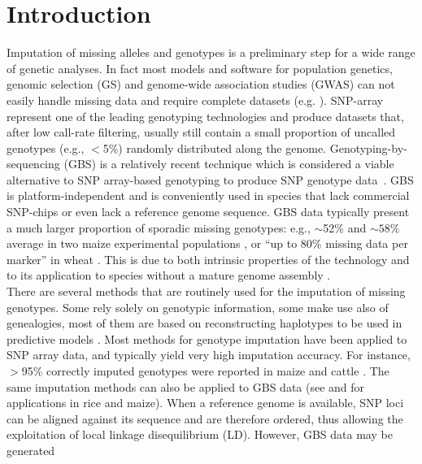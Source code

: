 \section{Introduction}
\label{intro}

Imputation of missing alleles and genotypes is a preliminary step for
a wide range of genetic analyses. In fact most models and software for 
population genetics, genomic selection (GS) and genome-wide association 
studies (GWAS) can not easily handle missing data and require complete datasets (e.g. \cite{hayes2009invited,aulchenko2007genabel,endelman2011rrblup,perez2014genome}). 
SNP-array represent one of the leading genotyping technologies and produce 
datasets that, after low call-rate filtering, 
usually still contain a small proportion of uncalled genotypes (e.g., $<$5\%) 
randomly distributed along the genome. Genotyping-by-sequencing (GBS) is a 
relatively recent technique which is considered a viable alternative to SNP array-based genotyping to produce SNP genotype data~\cite{elshire_robust_2011}.
GBS is platform-independent and is conveniently 
used in species that lack commercial SNP-chips or even lack a reference 
genome sequence. GBS data typically present a much larger proportion of 
sporadic missing genotypes: e.g., $\sim$52\% and $\sim 58\%$ average in two maize experimental populations \cite{crossa_genomic_2013},
or ``up to 80\% missing data per marker'' in wheat \cite{poland_genomic_2012}. This 
is due to both intrinsic properties of the technology
and to its application to species without a mature genome assembly \cite{glaubitz_tassel-gbs:_2014}.\\
There are several methods that are routinely used for the imputation of 
missing genotypes. Some rely solely on genotypic information, some make 
use also of genealogies, most of them are based on reconstructing haplotypes 
to be used in predictive models \cite{nicolazzi_software_2015}. Most methods for 
genotype imputation have been applied to SNP array data, and typically 
yield very high imputation accuracy. For instance, $>$95\% correctly imputed 
genotypes were reported in maize \cite{hickey_factors_2012} and cattle \cite{vanraden_genomic_2011}. 
The same imputation methods can also be applied to GBS data (see \cite{huang_efficient_2014} and \cite{swarts_novel_2014} for applications in rice and maize). When a reference 
genome is available, SNP loci can be aligned against its sequence and 
are therefore ordered, thus allowing the exploitation of local linkage disequilibrium (LD).
However, GBS data may be generated 
